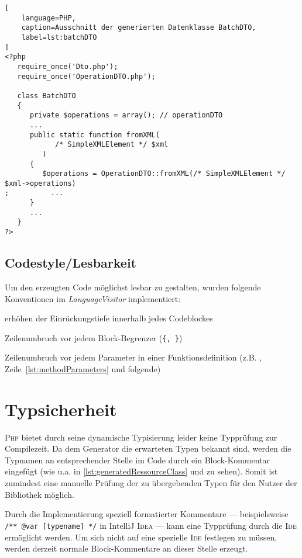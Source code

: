 \begin{minipage}{\textwidth}
\begin{lstlisting}[
    language=PHP,
    caption=Ausschnitt der generierten Datenklasse BatchDTO,
    label=lst:batchDTO
]
<?php
   require_once('Dto.php');
   require_once('OperationDTO.php');

   class BatchDTO
   {
      private $operations = array(); // operationDTO 
      ...
      public static function fromXML(
            /* SimpleXMLElement */ $xml
         )
      {
         $operations = OperationDTO::fromXML(/* SimpleXMLElement */ $xml->operations)
;          ...
      }
      ...
   }
?>
\end{lstlisting}
\end{minipage}

\subsection{Codestyle/Lesbarkeit}
\label{se:code_style_readability}

Um den erzeugten Code möglichst lesbar zu gestalten, wurden folgende Konventionen im \emph{LanguageVisitor} implementiert:
\begin{compactitem}
  \item erhöhen der Einrückungstiefe innerhalb jedes Codeblockes
  \item Zeilenumbruch vor jedem Block-Begrenzer (\texttt{\{, \}})
  \item Zeilenumbruch vor jedem Parameter in einer Funktionsdefinition (z.B. , Zeile~\ref{lst:methodParameters} und folgende)
\end{compactitem}

\section{Typsicherheit}
\label{sec:type_safety}

\textsc{Php} bietet durch seine dynamische Typisierung leider keine Typprüfung zur Compilezeit. Da dem Generator die erwarteten Typen bekannt sind, werden die Typnamen an entsprechender Stelle im Code durch ein Block-Kommentar eingefügt (wie u.a. in \cref{lst:generatedRessourceClass} und  zu sehen). Somit ist zumindest eine manuelle Prüfung der zu übergebenden Typen für den Nutzer der Bibliothek möglich.

Durch die Implementierung speziell formatierter Kommentare --- beispielsweise \texttt{/** @var [typename] */} in IntelliJ \textsc{Idea} --- kann eine Typprüfung durch die \textsc{Ide} ermöglicht werden. Um sich nicht auf eine spezielle \textsc{Ide} festlegen zu müssen, werden derzeit normale Block-Kommentare an dieser Stelle erzeugt.

